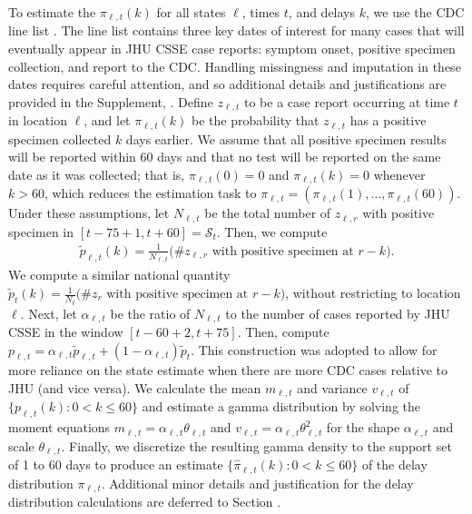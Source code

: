 To estimate the $\pi_{\ell,t}(k)$ for all states $\ell$, times $t$, and delays
$k$, we use the CDC line list \citep{cdc2020casepub,
cdc2020caserestr}. The line list contains three key dates of interest for many
cases that will eventually appear in JHU CSSE case reports: symptom onset,
positive specimen collection, and report to the CDC. Handling missingness and
imputation in these dates requires careful attention, and so additional details and
justifications are provided in the Supplement, .
Define $z_{\ell,t}$ to be a case report occurring at time $t$ in
location $\ell$, and let $\pi_{\ell,t}(k)$ be the probability that
$z_{\ell,t}$ has a positive specimen collected $k$ days earlier. We assume that
all positive specimen results will be reported within 60 days and that no test will be
reported on the same date as it was collected; that is, $\pi_{\ell,t}(0) = 0$
and $\pi_{\ell,t}(k) = 0$ whenever $k > 60$, which reduces the estimation task to
$\pi_{\ell,t} = (\pi_{\ell,t}(1), \dots, \pi_{\ell,t}(60))$.
Under these assumptions, let $N_{\ell,t}$ be the total number of
$z_{\ell,r}$ with positive specimen in $[t-75+1, t+60] = \mathcal{S}_t$. 
Then, we compute
\begin{align}
  \label{eq:line-list-delay}
    \tilde{p}_{\ell,t}(k) = \frac{1}{N_{\ell,t}} \big(\textrm{\# $z_{\ell,r}$ with positive specimen at $r-k$}\big).
\end{align}
We compute a similar national quantity $\tilde{p}_{t}(k) =
\frac{1}{N_{t}} \big(\textrm{\# $z_{r}$ with positive
specimen at $r-k$}\big)$, without restricting to location $\ell$. Next, let
$\alpha_{\ell,t}$ be the ratio of $N_{\ell,t}$ to the number of cases reported
by JHU CSSE\cite{dong2020interactive} in the window $[t-60+2, t+75]$. 
Then, compute $p_{\ell,t} = \alpha_{\ell,t}\tilde{p}_{\ell,t} +
(1-\alpha_{\ell,t})\tilde{p}_t$. This construction was adopted to allow for more reliance
on the state estimate when there are more CDC cases relative to JHU (and vice
versa). We calculate the mean $m_{\ell,t}$ and variance $v_{\ell,t}$ of
$\{p_{\ell,t}(k) : 0<k\leq 60\}$ and estimate a gamma distribution by solving
the moment equations $m_{\ell,t} = \alpha_{\ell,t}\theta_{\ell,t}$ and
$v_{\ell,t}= \alpha_{\ell,t}\theta_{\ell,t}^2$ for the shape $\alpha_{\ell,t}$
and scale $\theta_{\ell,t}$. Finally, we discretize the resulting gamma density
to the support set of 1 to 60 days to produce an estimate
$\{\widehat{\pi}_{\ell,t}(k): 0 < k \leq 60\}$ of the delay distribution
$\pi_{\ell,t}$. Additional minor details and justification for the delay 
distribution calculations are deferred to Section .
 
